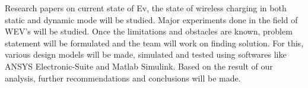 Research papers on current state of Ev, the state of wireless charging in both static and dynamic mode will be studied. Major experiments done in the field of WEV's will be studied. Once the limitations and obstacles are known, problem statement will be formulated and the team will work on finding solution. For this, various design models will be made, simulated and tested using softwares like ANSYS Electronic-Suite and Matlab Simulink. Based on the result of our analysis, further recommendations and conclusions will be made. 
